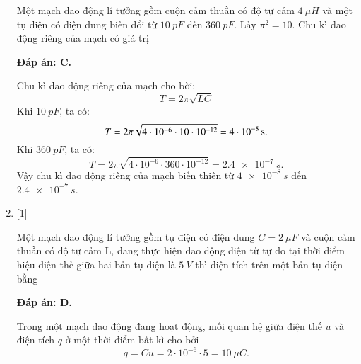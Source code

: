 \begin{enumerate}[label=\bfseries Câu \arabic*:]
	{Một mạch dao động lí tưởng gồm cuộn cảm thuần có độ tự cảm $\SI{4}{\mu H}$ và một tụ điện có điện dung biến đổi từ $\SI{10}{pF}$ đến $\SI{360}{pF}$. Lấy $\pi^2 = 10$. Chu kì dao động riêng của mạch có giá trị
	}
	
	\hideall
	{		\textbf{Đáp án: C.}
		
		Chu kì dao động riêng của mạch cho bời:
		$$
		T=2 \pi \sqrt{L C}
		$$
		Khi $\SI{10}{pF}$, ta có:
		$$
		T=2 \pi \sqrt{4\cdot10^{-6} \cdot 10\cdot10^{-12}}= \xsi{4\cdot10^{-8}}{s}.
		$$
		Khi $\SI{360}{pF}$, ta có:
		$$
		T=2 \pi \sqrt{4\cdot10^{-6} \cdot 360\cdot10^{-12}}= \SI{2,4 e-7}{s}.
		$$
		Vậy chu kì dao động riêng của mạch biến thiên từ $\SI{4 e-8}{s}$ đến $\SI{2,4 e-7}{s}$.
		
	}
	
	\item {} [1]
	
	{Một mạch dao động lí tưởng gồm tụ điện có điện dung $C = \SI{2}{\mu F}$ và cuộn cảm thuần có độ tự cảm L, đang thực hiện dao động điện từ tự do tại thời điểm hiệu điện thế giữa hai bản tụ điện là $\SI{5}{V}$ thì điện tích trên một bản tụ điện bằng
	}
	
	\hideall
	{		\textbf{Đáp án: D.}
		
		Trong một mạch dao động đang hoạt động, mối quan hệ giữa điện thế $u$ và điện tích $q$ ở một thời điểm bất kì cho bởi
		$$
		q=C u=2\cdot10^{-6} \cdot 5=\SI{10}{\mu C}.
		$$
		
}
\end{enumerate}
